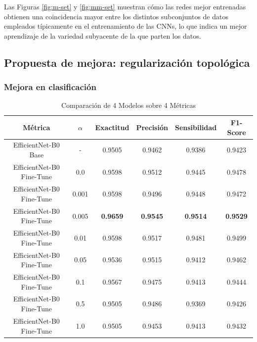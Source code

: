 Las Figuras \ref{fig:m-set} y \ref{fig:mm-set} muestran cómo las redes mejor entrenadas obtienen una coincidencia mayor entre los distintos subconjuntos de datos empleados típicamente en el entrenamiento de las CNNs, lo que indica un mejor aprendizaje de la variedad subyacente de la que parten los datos.

\subsection{Propuesta de mejora: regularización topológica}
\label{subsec:proposal}

\subsubsection{Mejora en clasificación}

\begin{table}[H]
	\centering
	\begin{adjustbox}{width=0.8\textwidth}
		\begin{tabular}{|c|c|c|c|c|c|}
			\hline
			\textbf{Métrica} & $\alpha$ & \textbf{Exactitud} & \textbf{Precisión} & \textbf{Sensibilidad} & \textbf{F1-Score} \\
			\hline
			EfficientNet-B0 Base & - & 0.9505 & 0.9462 & 0.9386 & 0.9423 \\
			\hline
			EfficientNet-B0 Fine-Tune & 0.0 & 0.9598 & 0.9512 & 0.9445 & 0.9478 \\
			\hline
			EfficientNet-B0 Fine-Tune & 0.001 & 0.9598 & 0.9496 & 0.9448 & 0.9472 \\
			\hline
			EfficientNet-B0 Fine-Tune & 0.005 & \textbf{0.9659} & \textbf{0.9545} & \textbf{0.9514} & \textbf{0.9529} \\
			\hline
			EfficientNet-B0 Fine-Tune & 0.01 & 0.9598 & 0.9517 & 0.9481 & 0.9499 \\
			\hline
			EfficientNet-B0 Fine-Tune & 0.05 & 0.9536 & 0.9515 & 0.9412 & 0.9462 \\
			\hline
			EfficientNet-B0 Fine-Tune & 0.1 & 0.9567 & 0.9475 & 0.9413 & 0.9444 \\
			\hline
			EfficientNet-B0 Fine-Tune & 0.5 & 0.9505 & 0.9486 & 0.9369 & 0.9426 \\
			\hline
			EfficientNet-B0 Fine-Tune & 1.0 & 0.9505 & 0.9453 & 0.9413 & 0.9432 \\
			\hline
		\end{tabular}
	\end{adjustbox}
	\caption{Comparación de 4 Modelos sobre 4 Métricas}
	\label{tab:model_comparison_test}
\end{table}

